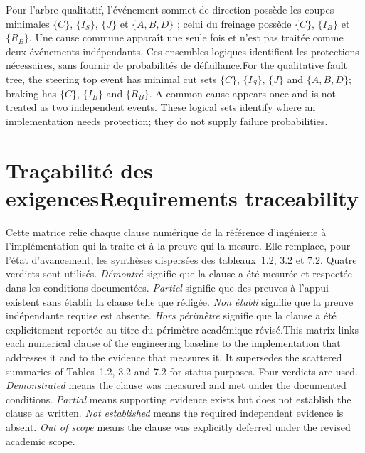 \documentclass[11pt,a4paper,oneside]{report}
\newcommand{\bi}[2]{\iffrench #2\else #1\fi}
\newcommand{\chap}[2]{\chapter{\bi{#1}{#2}}}
\begin{document}
\bi{For the qualitative fault tree, the steering top event has minimal cut sets $\{C\}$, $\{I_S\}$, $\{J\}$ and $\{A,B,D\}$; braking has $\{C\}$, $\{I_B\}$ and $\{R_B\}$. A common cause appears once and is not treated as two independent events. These logical sets identify where an implementation needs protection; they do not supply failure probabilities.}{Pour l'arbre qualitatif, l'événement sommet de direction possède les coupes minimales $\{C\}$, $\{I_S\}$, $\{J\}$ et $\{A,B,D\}$ ; celui du freinage possède $\{C\}$, $\{I_B\}$ et $\{R_B\}$. Une cause commune apparaît une seule fois et n'est pas traitée comme deux événements indépendants. Ces ensembles logiques identifient les protections nécessaires, sans fournir de probabilités de défaillance.}

\chap{Requirements traceability}{Traçabilité des exigences}
\label{app:trace}
\bi{This matrix links each numerical clause of the engineering baseline to the implementation that addresses it and to the evidence that measures it. It supersedes the scattered summaries of Tables~1.2, 3.2 and 7.2 for status purposes. Four verdicts are used. \emph{Demonstrated} means the clause was measured and met under the documented conditions. \emph{Partial} means supporting evidence exists but does not establish the clause as written. \emph{Not established} means the required independent evidence is absent. \emph{Out of scope} means the clause was explicitly deferred under the revised academic scope.}{Cette matrice relie chaque clause numérique de la référence d'ingénierie à l'implémentation qui la traite et à la preuve qui la mesure. Elle remplace, pour l'état d'avancement, les synthèses dispersées des tableaux~1.2, 3.2 et 7.2. Quatre verdicts sont utilisés. \emph{Démontré} signifie que la clause a été mesurée et respectée dans les conditions documentées. \emph{Partiel} signifie que des preuves à l'appui existent sans établir la clause telle que rédigée. \emph{Non établi} signifie que la preuve indépendante requise est absente. \emph{Hors périmètre} signifie que la clause a été explicitement reportée au titre du périmètre académique révisé.}
\end{document}
